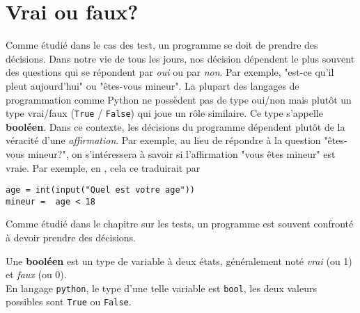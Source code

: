 
\vspace{-0.8cm}
\section{Vrai ou faux?}
Comme étudié dans le cas des test, un programme se doit de prendre des décisions. Dans notre vie de tous les jours, nos décision dépendent le plus souvent des questions qui se répondent par \textit{oui} ou par \textit{non}. Par exemple, "est-ce qu'il pleut aujourd'hui" ou "êtes-vous mineur". La plupart des langages de programmation comme Python ne possèdent pas de type oui/non mais plutôt un type vrai/faux (\lstinline{True} / \lstinline{False}) qui joue un rôle similaire. Ce type s'appelle \textbf{booléen}. Dans ce contexte, les décisions du programme dépendent plutôt de la véracité d'une \textit{affirmation}. Par exemple, au lieu de répondre à la question "êtes-vous mineur?", on s'intéressera à savoir si l'affirmation "vous êtes mineur" est vraie. Par exemple, en \py, cela ce traduirait par 
\begin{lstlisting}[numbers=none]
age = int(input("Quel est votre age"))
mineur =  age < 18
\end{lstlisting}

Comme étudié dans le chapitre sur les tests, un programme est souvent confronté à devoir prendre des décisions. 
\begin{mydefinition}
	Une \textbf{booléen} est un type de variable à deux états, généralement noté \textit{vrai} (ou 1) et \textit{faux} (ou 0). \\
	
	En langage \lstinline{python},  le type d’une telle variable est \lstinline{bool}, les deux valeurs possibles sont \lstinline{True} ou \lstinline{False}.
\end{mydefinition}

